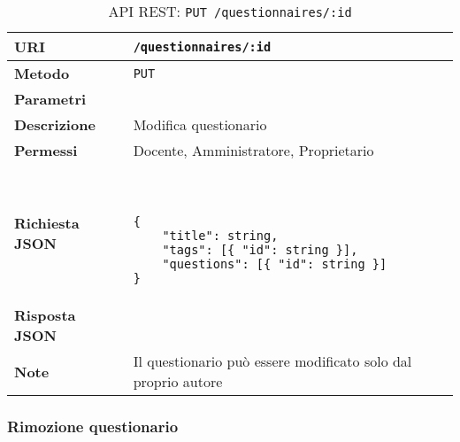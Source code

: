         \begin{table}[H]
            \begin{center}
                \begin{tabular}{p{} p{}}
                    \toprule
                    \textbf{URI} & \texttt{/questionnaires/:id} \\ \midrule
                    \textbf{Metodo} & \texttt{PUT} \\ \midrule
                    \textbf{Parametri} & \\ \midrule
                    \textbf{Descrizione} & Modifica questionario \\ \midrule
                    \textbf{Permessi} & Docente, Amministratore, Proprietario  \\ \midrule
                    \textbf{Richiesta JSON} & \
                        \begin{lstlisting}[basicstyle={\ttfamily}]
{
    "title": string,
    "tags": [{ "id": string }],
    "questions": [{ "id": string }] 
}
                        \end{lstlisting}
                        \\ \midrule
                    \textbf{Risposta JSON} & \\ \midrule
                    \textbf{Note} & Il questionario può essere modificato solo dal proprio autore \\
                    \bottomrule
                \end{tabular}
                \caption{API REST: \texttt{PUT /questionnaires/:id}}
            \end{center}
        \end{table}

    \subsubsection{Rimozione questionario}

